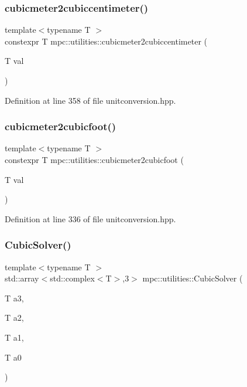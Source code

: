 \subsubsection{\texorpdfstring{cubicmeter2cubiccentimeter()}{cubicmeter2cubiccentimeter()}}
{\footnotesize\ttfamily template$<$typename T $>$ \\
constexpr T mpc\+::utilities\+::cubicmeter2cubiccentimeter (\begin{DoxyParamCaption}\item[{T}]{val }\end{DoxyParamCaption})}



Definition at line 358 of file unitconversion.\+hpp.

\mbox{\label{namespacempc_1_1utilities_ac73a70f3a631e074d3fc17b1df7e8d51}} 
\subsubsection{\texorpdfstring{cubicmeter2cubicfoot()}{cubicmeter2cubicfoot()}}
{\footnotesize\ttfamily template$<$typename T $>$ \\
constexpr T mpc\+::utilities\+::cubicmeter2cubicfoot (\begin{DoxyParamCaption}\item[{T}]{val }\end{DoxyParamCaption})}



Definition at line 336 of file unitconversion.\+hpp.

\mbox{\label{namespacempc_1_1utilities_adbffd8dee20ff121f91cf6be9e19a1b3}} 
\subsubsection{\texorpdfstring{Cubic\+Solver()}{CubicSolver()}}
{\footnotesize\ttfamily template$<$typename T $>$ \\
std\+::array$<$std\+::complex$<$T$>$,3$>$ mpc\+::utilities\+::\+Cubic\+Solver (\begin{DoxyParamCaption}\item[{T}]{a3,  }\item[{T}]{a2,  }\item[{T}]{a1,  }\item[{T}]{a0 }\end{DoxyParamCaption})}



